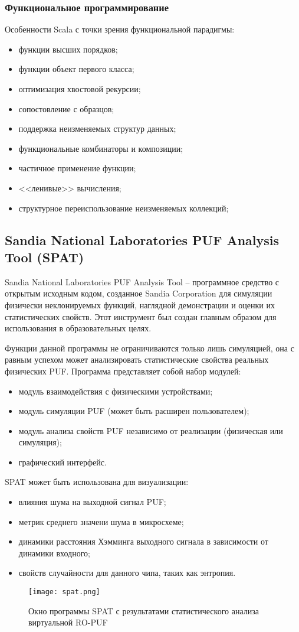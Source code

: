 \subsubsection{Функциональное программирование}
Особенности Scala с точки зрения функциональной парадигмы:
\begin{itemize}
  \item функции высших порядков;
  \item функции объект первого класса;
  \item оптимизация хвостовой рекурсии;
  \item сопостовление с образцов;
  \item поддержка неизменяемых структур данных;
  \item функциональные комбинаторы и композиции;
  \item частичное применение функции;
  \item <<ленивые>> вычисления;
  \item структурное переиспользование неизменяемых коллекций;
\end{itemize}

\subsection{Sandia National Laboratories PUF Analysis Tool (SPAT)}
\label{sec:techs:spat}
Sandia National Laboratories PUF Analysis Tool -- программное средство с открытым исходным кодом, созданное Sandia Corporation для симуляции физически неклонируемых функций, наглядной демонстрации и оценки их статистических свойств. Этот инструмент был создан главным образом для использования в образовательных целях.

Функции данной программы не ограничиваются только лишь симуляцией, она с равным успехом может анализировать статистические свойства реальных физических PUF.
Программа представляет собой набор модулей:
\begin{itemize}
  \item модуль взаимодействия с физическими устройствами;
  \item модуль симуляции PUF (может быть расширен пользователем);
  \item модуль анализа свойств PUF независимо от реализации (физическая или симуляция);
  \item графический интерфейс.
\end{itemize}
SPAT может быть использована для визуализации:
\begin{itemize}
  \item влияния шума на выходной сигнал PUF;
  \item метрик среднего значени шума в микросхеме;
  \item динамики расстояния Хэмминга выходного сигнала в зависимости от динамики входного;
  \item свойств случайности для данного чипа, таких как энтропия.
\end{itemize}
\begin{figure}[ht]
    \centering
    \texttt{[image: spat.png]}
    \caption{Окно программы SPAT с результатами статистического анализа виртуальной RO-PUF}
    \label{fig:techs:spat}
\end{figure}
